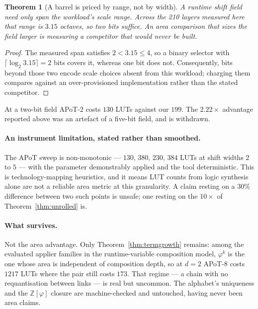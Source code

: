 \documentclass[11pt]{article}
\newtheorem{theorem}{Theorem}
\theoremstyle{definition}
\begin{document}
\begin{theorem}[A barrel is priced by range, not by width]
\label{thm:barrelrange}
A runtime shift field need only span the workload's scale range. Across the 210
layers measured here that range is $3.15$ octaves, so two bits suffice. An area
comparison that sizes the field larger is measuring a competitor that would never
be built.
\end{theorem}
\begin{proof}
The measured span satisfies $2<3.15\leq4$, so a binary selector with
$\lceil\log_2 3.15\rceil=2$ bits covers it, whereas one bit does not.
Consequently, bits beyond those two encode scale choices absent from this
workload; charging them compares against an over-provisioned implementation
rather than the stated competitor.
\end{proof}

At a two-bit field APoT-2 costs $130$ LUTs against our $199$. The $2.22\times$
advantage reported above was an artefact of a five-bit field, and is withdrawn.

\paragraph{An instrument limitation, stated rather than smoothed.} The APoT sweep
is non-monotonic --- $130$, $380$, $230$, $384$ LUTs at shift widths $2$ to $5$
--- with the parameter demonstrably applied and the tool deterministic. This is
technology-mapping heuristics, and it means LUT counts from logic synthesis alone
are not a reliable area metric at this granularity. A claim resting on a $30\%$
difference between two such points is unsafe; one resting on the $10\times$ of
Theorem~\ref{thm:unrolled} is.

\paragraph{What survives.} Not the area advantage. Only
Theorem~\ref{thm:termgrowth} remains: among the evaluated applier families in the
runtime-variable composition model, $\varphi^{k}$ is the one whose
area is independent of composition depth, so at $d=2$ APoT-8 costs $1217$ LUTs
where the pair still costs $173$. That regime --- a chain with no requantisation
between links --- is real but uncommon. The alphabet's uniqueness and the
$\mathbb{Z}[\varphi]$ closure are machine-checked and untouched, having never
been area claims.
\end{document}
